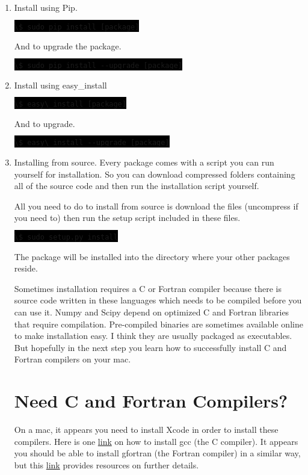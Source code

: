 \documentclass{article}
\newcommand{\inlinecode}[1]{%
\colorbox{black}{\lstinline[basicstyle=\ttfamily\color{white}]|#1|}}
\begin{document}
	\begin{enumerate}
		\item Install using Pip. 

		\inlinecode{\$ sudo pip install [package]}

		And to upgrade the package.

		\inlinecode{\$ sudo pip install --upgrade [package]}

		\item Install using easy\_install

		\inlinecode{\$ easy\_install [package]}

		And to upgrade.

		\inlinecode{\$ easy\_install --upgrade [package]}

		\item Installing from source. Every package comes with a 
		script you can run yourself for installation. So you can
		download compressed folders containing all of the source
		code and then run the installation script yourself. 

		All you need to do to install from source is download
		the files (uncompress if you need to) then run the setup
		script included in these files. 

		\inlinecode{\$ sudo setup.py install}
		
		The package will be installed into the directory where
		your other packages reside. 

		Sometimes
		installation requires a C or Fortran compiler because there
		is source code written in these languages which needs to be
		compiled before you can use it. Numpy and Scipy
		depend on optimized C and Fortran libraries that require
		compilation. Pre-compiled binaries are sometimes available
		online to make installation easy. I think they are usually
		packaged as executables. But hopefully in the next step
		you learn how to successfully install C and Fortran compilers
		on your mac.


		\section*{Need C and Fortran Compilers?}

		On a mac, it appears you need to install Xcode in order
		to install these compilers. Here is one 
		\href{http://www.cyberciti.biz/faq/howto-apple-mac-os-x-install-gcc-compiler/}{link} 
		on how to install gcc (the C compiler). It appears you should
		be able to install gfortran (the Fortran compiler) in a similar
		way, but this 
		\href{http://gcc.gnu.org/wiki/GFortranBinariesMacOS}{link} 
		provides resources on further details.


	\end{enumerate}
\end{document}
